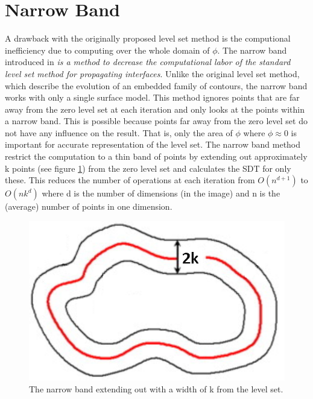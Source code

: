 \section{Narrow Band}
A drawback with the originally proposed level set method is the computional inefficiency due to computing over the whole domain of \(\phi\). The narrow band introduced in \cite{adalsteinsson94} \textit{is a method to decrease the computational labor of the standard level set method for propagating interfaces}. Unlike the original level set method, which describe the evolution of an embedded family of contours, the narrow band works with only a single surface model\cite{whitaker89}. This method ignores points that are far away from the zero level set at each iteration and only looks at the points within a narrow band. This is possible because points far away from the zero level set do not have any influence on the result. That is, only the area of \(\phi\) where \(\phi \approx 0\) is important for accurate representation of the level set. The narrow band method restrict the computation to a thin band of points by extending out approximately k points (see figure \ref{narrowBand}) from the zero level set and calculates the SDT for only these. This reduces the number of operations at each iteration from \(O(n^{d+1})\) to \(O(nk^{d})\) \cite{adalsteinsson94} where d is the number of dimensions (in the image) and n is the (average) number of points in one dimension. 
\begin{figure}[h!]
\centering
\includegraphics[width=.5\textwidth]{levelset/narrowBand}
\caption{The narrow band extending out with a width of k from the level set.}
\label{narrowBand}
\end{figure}
